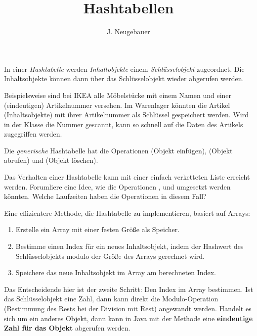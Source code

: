 \documentclass[10pt, a4paper]{scrartcl}
\author{J. Neugebauer}
\title{Hashtabellen}
\date{\Heute}
\begin{document}
\ReiheTitel

In einer \emph{Hashtabelle} werden \emph{Inhaltobjekte} einem \emph{Schlüsselobjekt} zugeordnet. Die Inhaltsobjekte können dann über das Schlüsselobjekt wieder abgerufen werden.

Beispielsweise sind bei IKEA alle Möbelstücke mit einem Namen und einer (eindeutigen) Artikelnummer versehen. Im Warenlager könnten die Artikel (Inhaltsobjekte) mit ihrer Artikelnummer als Schlüssel gespeichert werden. Wird in der Klasse die Nummer gescannt, kann so schnell auf die Daten des Artikels zugegriffen werden.

Die \emph{generische} Hashtabelle hat die Operationen  (Objekt einfügen),  (Objekt abrufen) und  (Objekt löschen).

\begin{center}
\end{center}

\begin{aufgabe}
Das Verhalten einer Hashtabelle kann mit einer einfach verketteten Liste erreicht werden. Forumliere eine Idee, wie die Operationen ,  und  umgesetzt werden könnten. Welche Laufzeiten haben die Operationen in diesem Fall?
\end{aufgabe}

Eine effizientere Methode, die Hashtabelle zu implementieren, basiert auf Arrays:
\begin{enumerate}
	\item Erstelle ein Array mit einer festen Größe als Speicher.
	\item Bestimme einen Index für ein neues Inhaltsobjekt, indem der Hashwert des Schlüsselobjekts modulo der Größe des Arrays gerechnet wird.
	\item Speichere das neue Inhaltsobjekt im Array am berechneten Index.
\end{enumerate}

Das Entscheidende hier ist der zweite Schritt: Den Index im Array bestimmen. Ist das Schlüsselobjekt eine Zahl, dann kann direkt die Modulo-Operation (Bestimmung des Rests bei der Division mit Rest) angewandt werden. Handelt es sich um ein anderes Objekt, dann kann in Java mit der Methode  eine \textbf{eindeutige Zahl für das Objekt} abgerufen werden.
\end{document}
